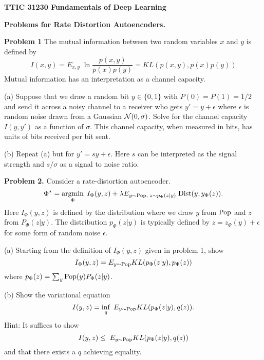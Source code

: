 \documentclass{article}
\begin{document}
\centerline{\bf TTIC 31230 Fundamentals of Deep Learning}

\bigskip

\centerline{\bf Problems for Rate Distortion Autoencoders.}

\bigskip
\bigskip

{\bf Problem 1}
The mutual information between two random variables $x$ and $y$ is defined by
$$I(x,y) = E_{x,y}\;\ln\frac{p(x,y)}{p(x)p(y)} = KL(p(x,y),p(x)p(y))$$
Mutual information has an interpretation as a channel capacity.

\medskip(a)
Suppose that
we draw a random bit $y \in \{0,1\}$ with $P(0) = P(1) = 1/2$ and send it across a noisy channel
to a receiver who gets $y' = y + \epsilon$ where $\epsilon$ is random noise drawn from a Gaussian ${\cal N}(0,\sigma)$.
Solve for the channel capacity $I(y,y')$ as a function of $\sigma$.
This channel capacity, when measured in bits, has units of bits received per bit sent.

\medskip
(b) Repeat (a) but for $y' = sy + \epsilon$.  Here $s$ can be interpreted as the signal strength
and $s/\sigma$ as a signal to noise ratio.

\bigskip
{\bf Problem 2.}
Consider a rate-distortion autoencoder.
$$\Phi^* = \operatorname*{argmin}_\Phi\;I_\Phi(y,z) + \lambda E_{y \sim \mathrm{Pop},\;z \sim p_\Phi(z|y)}\;\mathrm{Dist}(y,y_\Phi(z)).$$
Here $I_\Phi(y,z)$ is defined by the distribution where we draw $y$ from $\mathrm{Pop}$ and $z$ from $P_\Phi(z|y)$.  The distribution
$p_\Phi(z|y)$ is typically defined by $z = z_\Phi(y) + \epsilon$ for some form of random noise $\epsilon$.

\medskip
(a) Starting from the definition of $I_\Phi(y,z)$ given in problem 1, show
$$I_\Phi(y,z) = E_{y\sim \mathrm{Pop}} KL(p_\Phi(z|y),p_\Phi(z))$$
where $p_\Phi(z) = \sum_y \mathrm{Pop}(y)P_\Phi(z|y)$.

\medskip
(b) Show the variational equation
$$I(y,z) = \inf_q\;E_{y\sim \mathrm{Pop}} KL(p_\Phi(z|y),q(z)).$$
Hint: It suffices to show $$I(y,z) \leq \;E_{y\sim \mathrm{Pop}} KL(p_\Phi(z|y),q(z))$$
and that there exists a $q$ achieving equality.
\end{document}
